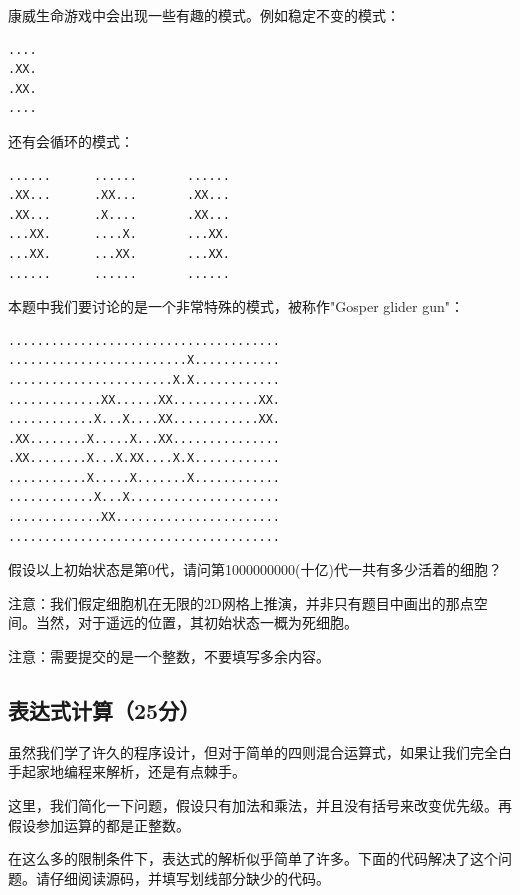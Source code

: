 \documentclass[a4paper, 12pt, twocolumn]{ctexart}
\begin{document}
	康威生命游戏中会出现一些有趣的模式。例如稳定不变的模式：
	
	\begin{lstlisting}
....
.XX.
.XX.
....
	\end{lstlisting}
	
	还有会循环的模式：
	\begin{lstlisting}
......      ......       ......
.XX...      .XX...       .XX...
.XX...      .X....       .XX...
...XX.      ....X.       ...XX.
...XX.      ...XX.       ...XX.
......      ......       ......
	\end{lstlisting}
	
	本题中我们要讨论的是一个非常特殊的模式，被称作"Gosper glider gun"：
	
	\begin{lstlisting}
......................................
.........................X............
.......................X.X............
.............XX......XX............XX.
............X...X....XX............XX.
.XX........X.....X...XX...............
.XX........X...X.XX....X.X............
...........X.....X.......X............
............X...X.....................
.............XX.......................
......................................
	\end{lstlisting}

	
	假设以上初始状态是第0代，请问第1000000000(十亿)代一共有多少活着的细胞？
	
	注意：我们假定细胞机在无限的2D网格上推演，并非只有题目中画出的那点空间。当然，对于遥远的位置，其初始状态一概为死细胞。
	
	注意：需要提交的是一个整数，不要填写多余内容。
	
	\subsection{表达式计算（25分）}
	
	虽然我们学了许久的程序设计，但对于简单的四则混合运算式，如果让我们完全白手起家地编程来解析，还是有点棘手。
	
	这里，我们简化一下问题，假设只有加法和乘法，并且没有括号来改变优先级。再假设参加运算的都是正整数。
	
	在这么多的限制条件下，表达式的解析似乎简单了许多。下面的代码解决了这个问题。请仔细阅读源码，并填写划线部分缺少的代码。
	
\end{document}
